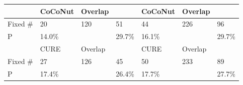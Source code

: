 {{\begin{table}[t]
\begin{center}
\begin{tabular}{p{0.8cm}<{\centering}|p{1.1cm}<{\centering}|p{0.8cm}<{\centering}|p{0.7cm}<{\centering}|p{1.1cm}<{\centering}|p{0.8cm}<{\centering}|p{0.7cm}<{\centering}}
			\hline
			             & CoCoNut   & Overlap   & \tool  & CoCoNut   & Overlap   & \tool \\
			\hline
			Fixed \#     & \cellcolor{mygray} 20  & 120   & \cellcolor{mygray} 51 & \cellcolor{mygray}44 &  226  & \cellcolor{mygray} 96\\
			P            &  14.0\%  &    &  29.7\% &  16.1\%  &    & 29.7\% \\
			\hline
			             & CURE   & Overlap   & \tool  & CURE   & Overlap   & \tool \\
			\hline
			Fixed \#     & \cellcolor{mygray} 27  &  126  & \cellcolor{mygray} 45 & \cellcolor{mygray} 50&  233  & \cellcolor{mygray} 89\\
			P            &  17.4\%  &    & 26.4\%  & 17.7\%   &    &  27.7\%\\
			\hline
		\end{tabular}
		\label{RQ3_results}
	\end{center}
\end{table}
}}